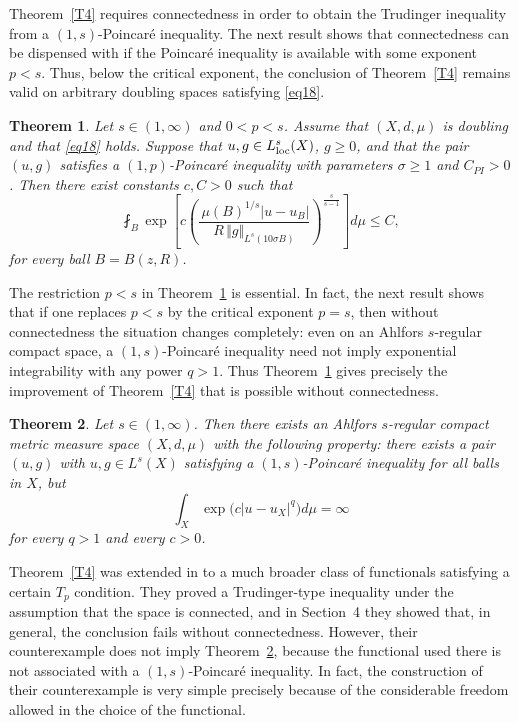 \documentclass[12pt,leqno]{amsart}
\newtheorem{theorem}{Theorem}
\theoremstyle{definition}
\numberwithin{theorem}{section} \numberwithin{equation}{section}
\begin{document}
Theorem~\ref{T4} requires connectedness in order to obtain the Trudinger inequality from a $(1,s)$-Poincar\'e inequality. The next result shows that connectedness can be dispensed with if the Poincar\'e inequality is available with some exponent $p<s$. Thus, below the critical exponent, the conclusion of Theorem~\ref{T4} remains valid on arbitrary doubling spaces satisfying \eqref{eq18}.

\begin{theorem}
\label{T9}
Let $s\in (1,\infty)$ and $0<p<s$. Assume that $(X,d,\mu)$ is doubling and that \eqref{eq18} holds. Suppose that $u,g\in L^s_{\rm loc}(X)$, $g\geq0$, and that the pair $(u,g)$ satisfies a $(1,p)$-Poincar\'e inequality with parameters $\sigma\geq1$ and $C_{PI}>0$. Then there exist constants $c,C>0$ such that
\begin{equation}
\label{eq50}
 \fint_B
 \exp\left[
 c\left(
 \frac{\,\mu(B)^{1/s}|u-u_B|}
 {R\,\Vert g\Vert_{L^s(10\sigma B)}}
 \right)^{\frac{s}{s-1}}
 \right]d\mu
 \leq C,
\end{equation}
for every ball $B=B(z,R)$. 
\end{theorem}

The restriction $p<s$ in Theorem~\ref{T9} is essential. In fact, the next result shows that if one replaces $p<s$ by the critical exponent $p=s$, then without connectedness the situation changes completely: even on an Ahlfors $s$-regular compact space, a $(1,s)$-Poincar\'e inequality need not imply exponential integrability with any power $q>1$. Thus Theorem~\ref{T9} gives precisely the improvement of Theorem~\ref{T4} that is possible without connectedness.

\begin{theorem}
\label{T3}
Let $s\in(1,\infty)$. Then there exists an Ahlfors $s$-regular compact metric measure space $(X,d,\mu)$ with the following property: there exists a pair $(u,g)$ with $u,g\in L^s(X)$ satisfying a $(1,s)$-Poincar\'e inequality for all balls in $X$, but
\begin{equation}
\label{eq40}
\int_X \exp\big(c|u-u_X|^q\big)d\mu=\infty
\end{equation}
for every $q>1$ and every $c>0$.
\end{theorem}

Theorem~\ref{T4} was extended in \cite{MP} to a much broader class of functionals satisfying a certain $T_p$ condition. They proved a Trudinger-type inequality under the assumption that the space is connected, and in Section~4 they showed that, in general, the conclusion fails without connectedness. However, their counterexample does not imply Theorem~\ref{T3}, because the functional used there is not associated with a $(1,s)$-Poincar\'e inequality. In fact, the construction of their counterexample is very simple precisely because of the considerable freedom allowed in the choice of the functional.
\end{document}
